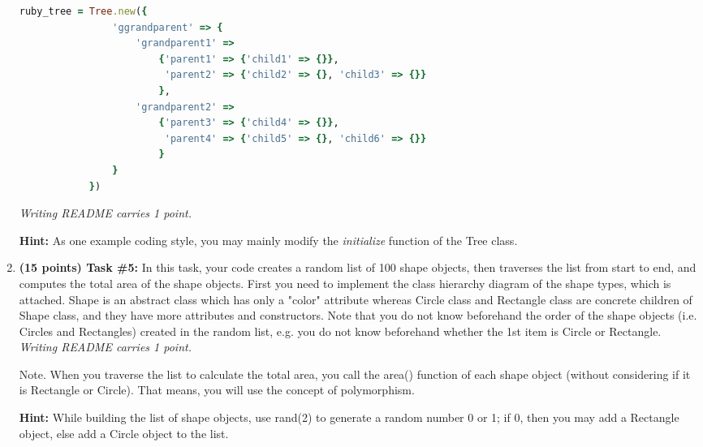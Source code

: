 \documentclass[paper=letter, fontsize=11pt]{scrartcl} %
\begin{document}
\begin{enumerate}[noitemsep]
        \begin{lstlisting}[language=Ruby]
            ruby_tree = Tree.new({
                'ggrandparent' => { 
                    'grandparent1' => 
                        {'parent1' => {'child1' => {}},
                         'parent2' => {'child2' => {}, 'child3' => {}} 
                        }, 
                    'grandparent2' => 
                        {'parent3' => {'child4' => {}}, 
                         'parent4' => {'child5' => {}, 'child6' => {}} 
                        }
                } 
            })
        \end{lstlisting}
\emph{Writing README carries 1 point.}

\textbf{Hint:} As one example coding style, you may mainly modify the \emph{initialize} function of the Tree class.
       \item \textbf{(15 points) Task \#5:} In this task, your code creates a random list of 100 shape objects, 
then traverses the list from start to end, and computes the total area of the shape objects. 
First you need to implement the class hierarchy diagram of the shape types, which is attached. 
Shape is an abstract class which has only a "color" attribute whereas Circle class and Rectangle 
class are concrete children of Shape class, and they have more attributes and constructors. 
Note that you do not know beforehand the order of the shape objects 
(i.e. Circles and Rectangles) created in the random list, e.g. you do not know beforehand whether the 1st item is Circle or Rectangle.
\emph{Writing README carries 1 point.}

Note. When you traverse the list to calculate the total area, you call the area() function of each shape object (without considering if it is Rectangle or Circle). That means, you will use the concept of polymorphism.

\textbf{Hint:} While building the list of shape objects, use rand(2) to generate a random number 0 or 1; if 0, then you may add a Rectangle object, else add a Circle object to the list.
    \end{enumerate}
       
\end{document}
